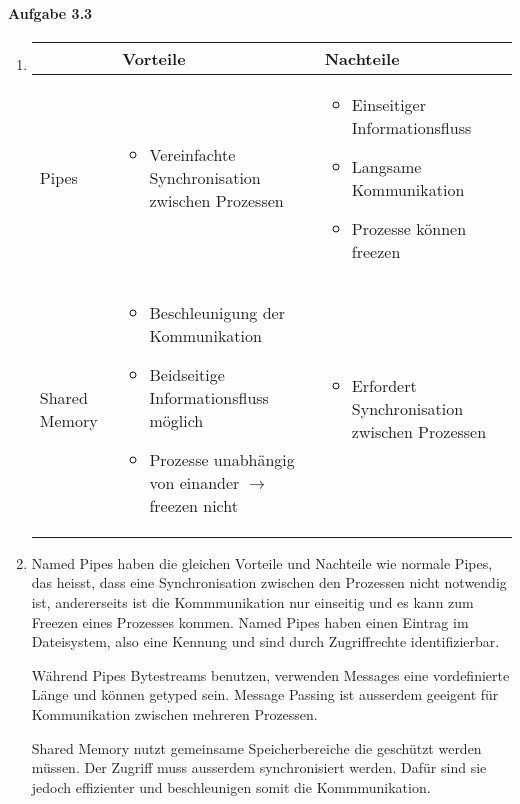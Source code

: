 \documentclass[11pt]{article}
\begin{document}
\paragraph{Aufgabe 3.3}
\begin{enumerate}[label=\alph*)]
\item
\begin{tabular}{ |p{3cm}||p{5cm}|p{5cm}| }
\hline
& Vorteile & Nachteile \\
\hline
\hline
Pipes &
\begin{itemize}
\item Vereinfachte Synchronisation zwischen Prozessen
\end{itemize} & \begin{itemize}
\item Einseitiger Informationsfluss
\item Langsame Kommunikation
\item Prozesse können freezen
\end{itemize}\\
\hline
Shared Memory & \begin{itemize}
\item Beschleunigung der Kommunikation
\item Beidseitige Informationsfluss möglich
\item Prozesse unabhängig von einander $\rightarrow$ freezen nicht
\end{itemize} & \begin{itemize}
\item Erfordert Synchronisation zwischen Prozessen
\end{itemize}\\
\hline
\end{tabular}

\item Named Pipes haben die gleichen Vorteile und Nachteile wie normale Pipes, das heisst, dass eine Synchronisation zwischen den Prozessen nicht notwendig ist, andererseits ist die Kommmunikation nur einseitig und es kann zum Freezen eines Prozesses kommen. Named Pipes haben einen Eintrag im Dateisystem, also eine Kennung und sind durch Zugriffrechte identifizierbar.

Während Pipes Bytestreams benutzen, verwenden Messages eine vordefinierte Länge und können getyped sein. Message Passing ist ausserdem geeigent für Kommunikation zwischen mehreren Prozessen.

Shared Memory nutzt gemeinsame Speicherbereiche die geschützt werden müssen. Der Zugriff muss ausserdem synchronisiert werden. Dafür sind sie jedoch effizienter und beschleunigen somit die Kommmunikation.


\end{enumerate}
\end{document}
